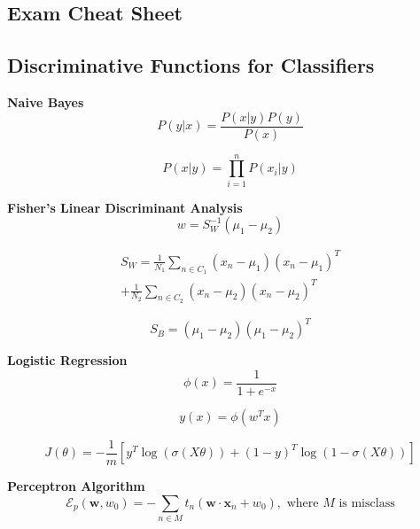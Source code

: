 \documentclass[8pt]{article}
\begin{document}
\begin{multicols}{2}
\section*{Exam Cheat Sheet}

\subsection*{Discriminative Functions for Classifiers}
\textbf{Naive Bayes}
\begin{equation}
    P(y|x) = \frac{P(x|y)P(y)}{P(x)}
\end{equation}

\begin{equation}
    P(x|y) = \prod_{i=1}^{n} P(x_i|y)
\end{equation}

\textbf{Fisher's Linear Discriminant Analysis}
\begin{equation}
    w = S_W^{-1} (\mu_1 - \mu_2)
\end{equation}

\begin{multline}
    S_W = \frac{1}{N_1} \sum_{n \in C_1} (x_n - \mu_1)(x_n - \mu_1)^T \\
    + \frac{1}{N_2} \sum_{n \in C_2} (x_n - \mu_2)(x_n - \mu_2)^T
\end{multline}

\begin{equation}
    S_B = (\mu_1 - \mu_2)(\mu_1 - \mu_2)^T
\end{equation}

\textbf{Logistic Regression}
\begin{equation}
    \phi(x) = \frac{1}{1 + e^{-x}}
\end{equation}

\begin{equation}
    y(x) = \phi(w^T x)
\end{equation}

\begin{equation}
    J(\theta) = -\frac{1}{m} [y^T\log(\sigma(X\theta)) + (1-y)^T\log(1-\sigma(X\theta))]
\end{equation}

\textbf{Perceptron Algorithm}
\begin{equation}
    \mathcal{E}_p (\mathbf{w}, w_0) = -\sum_{n \in M} t_n(\mathbf{w} \cdot \mathbf{x}_n + w_0), \text{ where } M \text{ is misclass} 
\end{equation}


\end{multicols}
\end{document}
